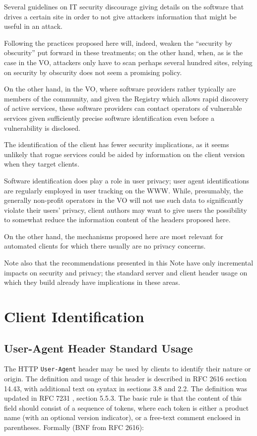 \documentclass[11pt,a4paper]{ivoa}
\newcommand{\headername}[1]{{\tt #1}}
\begin{document}
Several guidelines on IT security discourage giving details on the
software that drives a certain site in order to not give attackers
information that might be useful in an attack.

Following the practices proposed here will, indeed, weaken the
``security by obscurity'' put forward in these treatments; on the other
hand, when, as is the case in the VO, attackers only have
to scan perhaps several hundred sites,
relying on security by obscurity does not seem a promising policy.

On the other
hand, in the VO, where software providers rather typically are members
of the community, and given the Registry which allows rapid discovery of
active services, these software providers can contact
operators of vulnerable services given sufficiently precise software
identification even before a vulnerability is disclosed.

The identification of the client has fewer security implications, as it
seems unlikely that rogue services could be aided by information on the
client version when they target clients.

Software identification does play a role in user privacy;
user agent identifications
are regularly employed in user tracking on the WWW.  While, presumably,
the generally non-profit operators in the VO will not use such data to
significantly violate their users' privacy, client authors may want to
give users the possibility to somewhat reduce the information content of
the headers proposed here.

On the other hand, the mechanisms proposed here are most relevant for
automated clients for which there usually are no privacy concerns.

Note also that the recommendations presented in this Note
have only incremental impacts on security and privacy;
the standard server and client header usage on which they
build already have implications in these areas.


\section{Client Identification}
\label{sect:client}

\subsection{User-Agent Header Standard Usage}
\label{sect:user-agent}

The HTTP \headername{User-Agent} header may be used by clients
to identify their
nature or origin. The definition and usage of this header is described
in RFC 2616 \citep{std:HTTP} section 14.43, with additional text on
syntax in sections 3.8 and 2.2.
The definition was updated in RFC 7231 \citep{std:RFC7231}, section 5.5.3.
The basic rule is that the content of
this field should consist of a sequence of tokens, where each token is
either a product name (with an optional version indicator), or a
free-text comment enclosed in parentheses. Formally (BNF from RFC 2616):
\end{document}
